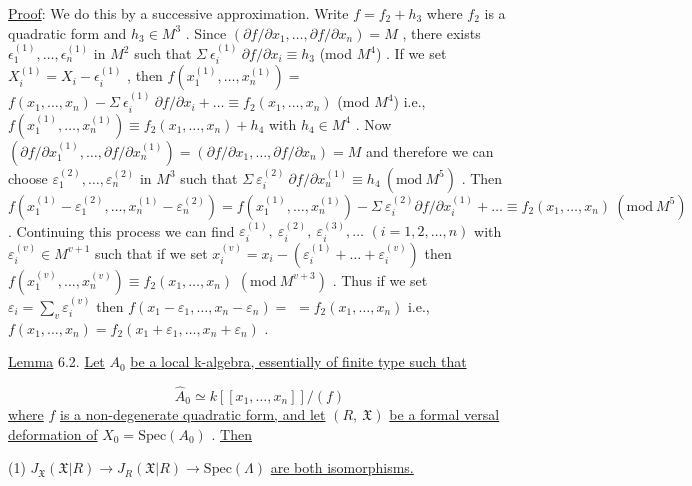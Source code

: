 \underline{Proof}:  We do this by a successive approximation. Write  $f = f_2 + h_3$  where  $f_2$ is a quadratic form and  $h_3 \in M^3$  . Since  $(\partial f/\partial x_1,\ldots,\partial f/\partial x_n) = M$  , there exists $\epsilon_1^{(1)},\ldots,\epsilon_n^{(1)}$  in  $M^2$  such that  $\Sigma\ \epsilon_i^{(1)}\ \partial f/\partial x_i \equiv h_3$  (mod $M^4$)  . If we set $X_i^{(1)} = X_i - \epsilon_i^{(1)}$  , then  $f(x_1^{(1)},\ldots,x_n^{(1)}) =$ $f(x_1,\ldots,x_n) - \Sigma\ \epsilon_i^{(1)}\ \partial f/\partial x_i + \ldots \equiv f_2(x_1,\ldots,x_n)$  (mod $M^4$)  i.e., $f(x_1^{(1)},\ldots,x_n^{(1)}) \equiv f_2(x_1,\ldots,x_n) + h_4$  with  $h_4 \in M^4$  . Now $(\partial f/\partial x_1^{(1)},\ldots,\partial f/\partial x_n^{(1)}) = (\partial f/\partial x_1,\ldots,\partial f/\partial x_n) = M$  and therefore we can choose
$\varepsilon_1^{(2)},\dots,\varepsilon_n^{(2)}$  in  $M^3$  such that  $\Sigma\ \varepsilon_i^{(2)}\ \partial f/\partial x_u^{(1)} \equiv h_4\ (\mathrm{mod}\ M^5)$ . Then $f(x_1^{(1)} - \varepsilon_1^{(2)},\dots,x_n^{(1)} - \varepsilon_n^{(2)}) = f(x_1^{(1)},\dots,x_n^{(1)}) - \Sigma\ \varepsilon_i^{(2)}\partial f/\partial x_i^{(1)} + \dots \equiv f_2(x_1,\dots,x_n)\ (\mathrm{mod}\ M^5)$ . Continuing this process we can find $\varepsilon_i^{(1)},\ \varepsilon_i^{(2)},\ \varepsilon_i^{(3)},\dots$  $(i = 1,2,\dots,n)$  with  $\varepsilon_i^{(v)} \in M^{v+1}$  such that if we set $x_i^{(v)} = x_i - (\varepsilon_i^{(1)} + \dots + \varepsilon_i^{(v)})$  then  $f(x_1^{(v)},\dots,x_n^{(v)}) \equiv f_2(x_1,\dots,x_n)$ $(\mathrm{mod}\ M^{v+3})$ . Thus if we set  $\varepsilon_i = \sum_{v} \varepsilon_i^{(v)}$  then  $f(x_1-\varepsilon_1,\dots,x_n-\varepsilon_n) =$ $= f_2(x_1,\dots,x_n)$  i.e.,  $f(x_1,\dots,x_n) = f_2(x_1+\varepsilon_1,\dots,x_n+\varepsilon_n)$ .

\underline{Lemma} 6.2.   \underline{Let}  $A_0$  \underline{be a local k-algebra, essentially of finite type such that}

\begin{equation*}
\hat{A}_0 \simeq k[[x_1,\dots,x_n]]/(f)
\end{equation*}
\underline{where}  $f$  \underline{is a non-degenerate quadratic form, and let}  $(R,\ \mathfrak{X})$  \underline{be a formal versal deformation of}  $X_0 = \mathrm{Spec}(A_0)$  . \underline{Then}

(1)  $J_{\mathfrak{X}}(\mathfrak{X}|R) \rightarrow J_R(\mathfrak{X}|R) \rightarrow \mathrm{Spec}(\Lambda)$  \underline{are both isomorphisms.}

